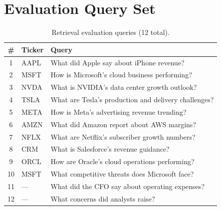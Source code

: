 \documentclass[12pt,a4paper]{article}
\begin{document}
\section{Evaluation Query Set}
\label{app:eval-queries}

\begin{longtable}{@{}clp{8cm}@{}}
\caption{Retrieval evaluation queries (12 total).} \label{tab:eval-queries} \\
\toprule
\textbf{\#} & \textbf{Ticker} & \textbf{Query} \\
\midrule
\endfirsthead
1 & AAPL & What did Apple say about iPhone revenue? \\
2 & MSFT & How is Microsoft's cloud business performing? \\
3 & NVDA & What is NVIDIA's data center growth outlook? \\
4 & TSLA & What are Tesla's production and delivery challenges? \\
5 & META & How is Meta's advertising revenue trending? \\
6 & AMZN & What did Amazon report about AWS margins? \\
7 & NFLX & What are Netflix's subscriber growth numbers? \\
8 & CRM & What is Salesforce's revenue guidance? \\
9 & ORCL & How are Oracle's cloud operations performing? \\
10 & MSFT & What competitive threats does Microsoft face? \\
11 & --- & What did the CFO say about operating expenses? \\
12 & --- & What concerns did analysts raise? \\
\bottomrule
\end{longtable}
\end{document}
